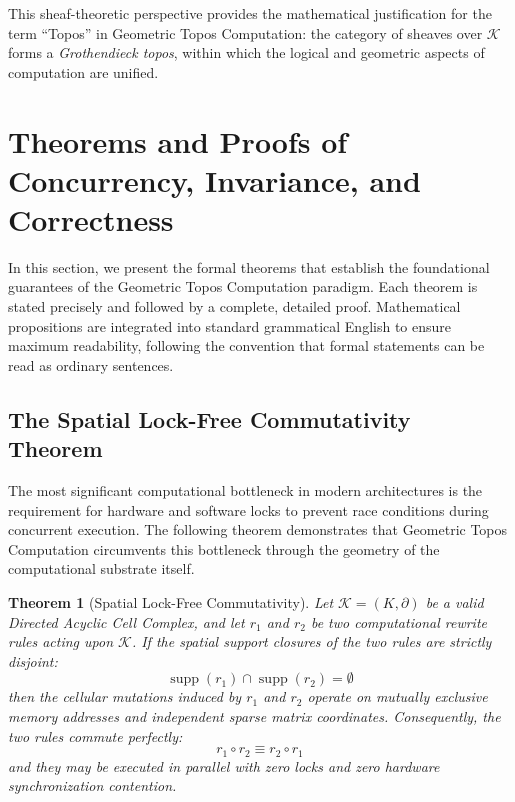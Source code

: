 \documentclass[manuscript, nonacm, review=false]{acmart}
\theoremstyle{definition}
\theoremstyle{plain}
\newtheorem{theorem}{Theorem}[section]
\newcommand{\K}{\mathcal{K}}
\newcommand{\supp}{\operatorname{supp}}
\begin{document}
This sheaf-theoretic perspective provides the mathematical justification for the term ``Topos'' in Geometric Topos Computation: the category of sheaves over $\K$ forms a \emph{Grothendieck topos}, within which the logical and geometric aspects of computation are unified.



\section{Theorems and Proofs of Concurrency, Invariance, and Correctness}
\label{sec:theorems}

In this section, we present the formal theorems that establish the foundational guarantees of the Geometric Topos Computation paradigm. Each theorem is stated precisely and followed by a complete, detailed proof. Mathematical propositions are integrated into standard grammatical English to ensure maximum readability, following the convention that formal statements can be read as ordinary sentences.

\subsection{The Spatial Lock-Free Commutativity Theorem}
\label{subsec:commutativity_theorem}

The most significant computational bottleneck in modern architectures is the requirement for hardware and software locks to prevent race conditions during concurrent execution. The following theorem demonstrates that Geometric Topos Computation circumvents this bottleneck through the geometry of the computational substrate itself.

\begin{theorem}[Spatial Lock-Free Commutativity]
\label{thm:commutativity}
Let $\K = (K, \partial)$ be a valid Directed Acyclic Cell Complex, and let $r_1$ and $r_2$ be two computational rewrite rules acting upon $\K$. If the spatial support closures of the two rules are strictly disjoint:
\begin{equation}
    \supp(r_1) \cap \supp(r_2) = \emptyset
\end{equation}
then the cellular mutations induced by $r_1$ and $r_2$ operate on mutually exclusive memory addresses and independent sparse matrix coordinates. Consequently, the two rules \emph{commute perfectly}:
\begin{equation}
    r_1 \circ r_2 \equiv r_2 \circ r_1
\end{equation}
and they may be executed in parallel with zero locks and zero hardware synchronization contention.
\end{theorem}
\end{document}
